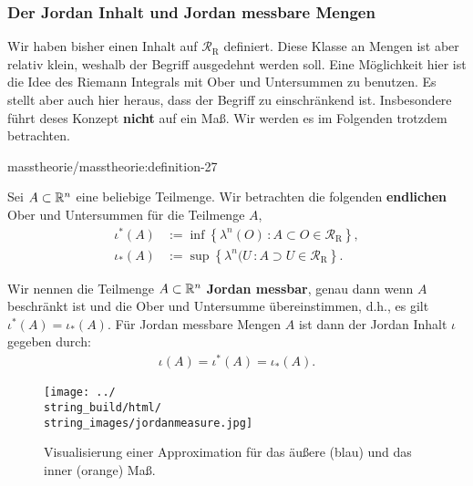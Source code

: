 \subsubsection{Der Jordan Inhalt und Jordan messbare Mengen}
\label{\detokenize{masstheorie/masstheorie:der-jordan-inhalt-und-jordan-messbare-mengen}}
\par
Wir haben bisher einen Inhalt auf \(\mathcal{R}_{\text{R}}\) definiert. Diese Klasse an Mengen ist aber relativ klein, weshalb der Begriff ausgedehnt werden soll. Eine Möglichkeit hier ist die Idee des Riemann Integrals mit Ober  und Untersummen zu benutzen. Es stellt aber auch hier heraus, dass der Begriff zu einschränkend ist. Insbesondere führt deses Konzept \textbf{nicht} auf ein Maß. Wir werden es im Folgenden trotzdem betrachten.
\begin{definition}{}{masstheorie/masstheorie:definition-27}



\par
Sei \(A \subset \mathbb{R}^n\) eine beliebige Teilmenge.
Wir betrachten die folgenden \textbf{endlichen} Ober  und Untersummen für die Teilmenge \(A\),
\begin{align*}
\iota^\ast(A) &:= \inf \left\{ \lambda^n(O) \, : A \subset O \in\mathcal{R}_{\text{R}}\right\},\\
\iota_\ast(A) &:= \sup \left\{ \lambda^n(U \, : A \supset U\in\mathcal{R}_{\text{R}} \right\}.
\end{align*}
\par
Wir nennen die Teilmenge \(A \subset \mathbb{R}^n\) \textbf{Jordan messbar}, genau dann wenn \(A\) beschränkt ist und die Ober  und Untersumme übereinstimmen, d.h., es gilt \(\iota^\ast(A) = \iota_\ast(A)\).
Für Jordan messbare Mengen \(A\) ist dann der Jordan Inhalt \(\iota\) gegeben durch:
\begin{align*}
\iota(A) = \iota^\ast(A) = \iota_\ast(A).
\end{align*}\end{definition}

\begin{figure}[htbp]
\centering


\noindent\texttt{[image: ../\\string\_build/html/\\string\_images/jordanmeasure.jpg]}
\caption{Visualisierung einer Approximation für das äußere (blau) und das inner (orange) Maß.}\label{\detokenize{masstheorie/masstheorie:fig-jordanmeasure}}\end{figure}

